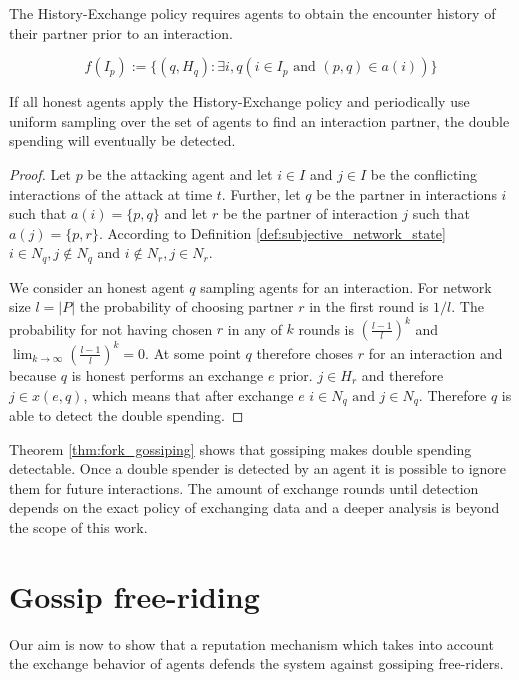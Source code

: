 \begin{pol}
    \label{pol:one}
    The History-Exchange policy requires agents to obtain the encounter history of their partner 
    prior to an interaction. 

    \[ f(I_p) := \{ (q, H_q) : \exists i, q (i \in I_p \text{ and } (p, q) \in a(i)) \}\]
\end{pol}


\begin{thm}
    \label{thm:fork_gossiping}
    If all honest agents apply the History-Exchange policy and periodically use uniform sampling over
    the set of agents to find an interaction partner, the double spending will eventually be detected.
\end{thm}
\begin{proof}
    Let $p$ be the attacking agent and let $i \in I$ and $j \in I$ be the conflicting interactions 
    of the attack at time $t$. Further, let $q$ be the partner in interactions $i$ such that 
    $a(i) = \{p, q\}$ and let $r$ be the partner of interaction $j$ such that $a(j) = \{p, r\}$. 
    According to Definition \ref{def:subjective_network_state} $i \in N_{q}, j \notin N_{q}$ and 
    $i \notin N_{r}, j \in N_{r}$.

    We consider an honest agent $q$ sampling agents for an interaction. For network size $l = |P|$ the 
    probability of choosing partner $r$ in the first round is $1/l$. The probability for not having
    chosen $r$ in any of $k$ rounds is $(\frac{l-1}{l})^k$ and $\lim_{k\to\infty}(\frac{l-1}{l})^k = 0$.
    At some point $q$ therefore choses $r$ for an interaction and because $q$ is honest performs an 
    exchange $e$ prior. $j \in H_r$ and therefore $j \in x(e, q)$, which means that after exchange 
    $e$ $i \in N_q \text{ and } j \in N_q$. Therefore $q$ is able to detect the double spending.
\end{proof}

Theorem \ref{thm:fork_gossiping} shows that gossiping makes double spending detectable. Once a double
spender is detected by an agent it is possible to ignore them for future interactions. The amount 
of exchange rounds until detection depends on the exact policy of exchanging data and a deeper 
analysis is beyond the scope of this work.

\section{Gossip free-riding}
Our aim is now to show that a reputation mechanism which takes into account the exchange behavior of 
agents defends the system against gossiping free-riders. 

